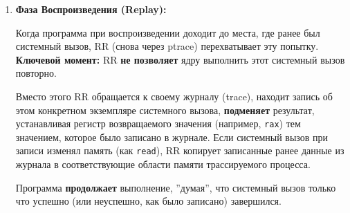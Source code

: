 \begin{enumerate}
\begin{itemize}
      RR снова ждет \texttt{wait\_pid(T)}. Он получает результат \textbf{N =
      syscall\_result\_reg} (количество прочитанных байт). Затем \textbf{save N scratch
      bytes to trace} – эти N байт из ''чернового'' буфера сохраняются в журнал. И
      очень важный шаг: \textbf{copy N scratch bytes to buf} – RR копирует данные из
      своего ''чернового'' буфера в оригинальный буфер трассируемого процесса.
      Теперь для процесса все выглядит так, как будто \texttt{read} выполнился
      совершенно нормально и записал данные в его буфер.

      RR разрешает трассируемому процессу продолжить обычное выполнение,
      используя \textbf{ptrace(T, CONT\_SYSCALL)}.

    \end{itemize}

  \item \textbf{Фаза Воспроизведения (Replay):}

  Когда программа при воспроизведении доходит до места, где ранее был системный
  вызов, RR (снова через ptrace) перехватывает эту попытку. \textbf{Ключевой
  момент:} RR \textbf{не позволяет} ядру выполнить этот системный вызов
  повторно. 
  
  Вместо этого RR обращается к своему журналу (trace), находит запись об этом
  конкретном экземпляре системного вызова, \textbf{подменяет} результат,
  устанавливая регистр возвращаемого значения (например, \texttt{rax}) тем
  значением, которое было записано в журнале. Если системный вызов при записи
  изменял память (как \texttt{read}), RR копирует записанные ранее данные из журнала в
  соответствующие области памяти трассируемого процесса.

  Программа \textbf{продолжает} выполнение, ''думая'', что системный вызов только что
  успешно (или неуспешно, как было записано) завершился.

\end{enumerate}

